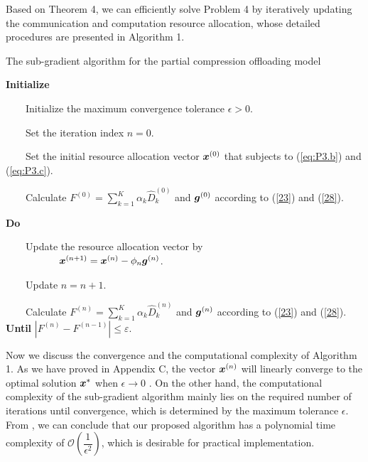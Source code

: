 \documentclass[journal,draftcls,onecolumn,12pt,twoside]{IEEEtran}
\newcommand{\bm}[1]{\mbox{\boldmath{$#1$}}}
\begin{document}
Based on Theorem 4, we can efficiently solve Problem 4 by iteratively updating the communication and computation resource allocation, whose detailed procedures are presented in Algorithm 1.
    \begin{table}[!htp]
		\vspace{-2em}
		\begin{algorithm}[H]
			\caption{The sub-gradient algorithm for the partial compression offloading model}
			{\normalsize
				\begin{algorithmic}[1]
					
					\STATE \textbf{Initialize}
					
					\STATE ~~~~Initialize the maximum convergence tolerance $\epsilon > 0$.
					
					\STATE ~~~~Set the iteration index $n=0$.

                    \STATE ~~~~Set the initial resource allocation vector ${\bm{x}}^{(0)}$ that subjects to (\ref{eq:P3.b}) and (\ref{eq:P3.c}).
					
					\STATE ~~~~Calculate $F^{(0)} = \sum_{k=1}^K \alpha_k \widehat{D}_k^{(0)}$ and ${\bm{g}}^{(0)}$ according to (\ref{23}) and (\ref{28}).
					
					\STATE \textbf{Do}
					
					\STATE ~~~~Update the resource allocation vector by \\
					~~~~~~~~~~
					$	{\bm{x}}^{(n+1)} = {\bm{x}}^{(n)}-\phi_n {\bm{g}}^{(n)}$.
									
                    \STATE ~~~~Update $n=n+1$.

					\STATE ~~~~Calculate $F^{(n)} = \sum_{k=1}^K \alpha_k \widehat{D}_k^{(n)}$ and ${\bm{g}}^{(n)}$  according to (\ref{23}) and (\ref{28}).
					\STATE \textbf{Until} $|F^{(n)} - F^{(n-1)}| \le \varepsilon$.
			\end{algorithmic}}
		\end{algorithm}
	\end{table}
\vspace{-2em}

Now we discuss the convergence and the computational complexity of Algorithm 1. As we have proved in Appendix C, the vector $\bm{x}^{(n)}$ will linearly converge to the optimal solution $\bm{x}^*$ when $\epsilon \rightarrow 0$ \cite{Convex_Optimization_II}. On the other hand, the computational complexity of the sub-gradient algorithm mainly lies on the required number of iterations until convergence, which is determined by the maximum tolerance $\epsilon$. From \cite{Optimization_Methods_for_Large-Scale_Systems}, we can conclude that our proposed algorithm has a polynomial time complexity of $\mathcal{O}\left(\dfrac{1}{\epsilon^2}\right)$, which is desirable for  practical implementation.
\end{document}
